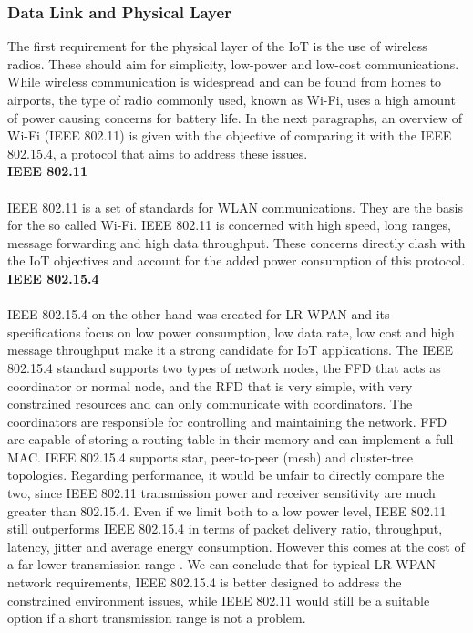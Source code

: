 \documentclass{sig-alternate-05-2015}
\begin{document}
\subsubsection{Data Link and Physical Layer}
The first requirement for the physical layer of the \gls{IoT} is the use of wireless radios. These should aim for simplicity, low-power and low-cost communications. While wireless communication is widespread and can be found from homes to airports, the type of radio commonly used, known as Wi-Fi, uses a high amount of power causing concerns for battery life. In the next paragraphs, an overview of Wi-Fi (IEEE 802.11) is given with the objective of comparing it with the IEEE 802.15.4, a protocol that aims to address these issues.\\

\textbf{IEEE 802.11}\\\\
IEEE 802.11 \cite{IEEE2012} is a set of standards for \gls{WLAN} communications. They are the basis for the so called Wi-Fi. IEEE 802.11 is concerned with high speed, long ranges, message forwarding and high data throughput. These concerns directly clash with the \gls{IoT} objectives and account for the added power consumption of this protocol.\\

\textbf{IEEE 802.15.4}\\\\
IEEE 802.15.4 \cite{IEEEComputerSociety2011} on the other hand was created for \gls{LR-WPAN} and its specifications focus on low power consumption, low data rate, low cost and high message throughput make it a strong candidate for \gls{IoT} applications.
	The IEEE 802.15.4 standard supports two types of network nodes, the \gls{FFD} that acts as coordinator or normal node, and the \gls{RFD} that is very simple, with very constrained resources and can only communicate with coordinators. The coordinators are responsible for controlling and maintaining the network. \gls{FFD} are capable of storing a routing table in their memory and can implement a full \gls{MAC}.
	IEEE 802.15.4 supports star, peer-to-peer (mesh) and cluster-tree topologies.
	Regarding performance, it would be unfair to directly compare the two, since IEEE 802.11 transmission power and receiver sensitivity are much greater than 802.15.4. Even if we limit both to a low power level, IEEE 802.11 still outperforms IEEE 802.15.4 in terms of packet delivery ratio, throughput, latency, jitter and average energy consumption. However this comes at the cost of a far lower transmission range \cite{Transmission2011}.
	We can conclude that for typical \gls{LR-WPAN} network requirements, IEEE 802.15.4 is better designed to address the constrained environment issues, while IEEE 802.11 would still be a suitable option if a short transmission range is not a problem.
\end{document}
